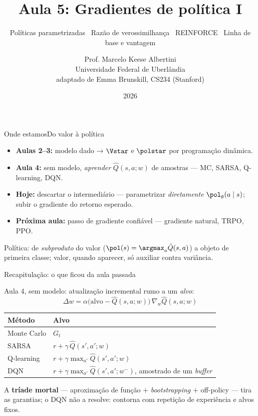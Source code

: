 \documentclass[aspectratio=169, 11pt]{beamer}
\title[Aula 5 — Gradientes de política I]{Aula 5: Gradientes de política I}
\subtitle[Aprendizagem por Reforço]{Políticas parametrizadas \textbullet\ Razão de verossimilhança \textbullet\ REINFORCE \textbullet\ Linha de base e vantagem}
\author[Prof. Marcelo K. Albertini]{Prof. Marcelo Keese Albertini \\
  \footnotesize Universidade Federal de Uberlândia \\
  \footnotesize adaptado de Emma Brunskill, CS234 (Stanford)}
\institute{Universidade Federal de Uberlândia}
\date{2026}
\newcommand{\thv}{\theta}                       %
\newcommand{\wv}{w}                             %
\newcommand{\polth}{\pol_{\thv}}                %
\newcommand{\Qhat}{\hat{Q}}
\begin{document}
\begin{frame}\titlepage\end{frame}

\begin{frame}{Onde estamos}{Do valor à política}

  \begin{itemize}\setlength{\itemsep}{0.5ex}
    \item \textbf{Aulas 2--3:} modelo dado → $\Vstar$ e $\polstar$ por
      programação dinâmica.
    \item \textbf{Aula 4:} sem modelo, \emph{aprender} $\Qhat(s,a;\wv)$ de
      amostras --- MC, SARSA, Q-learning, DQN.
    \item \textbf{Hoje:} descartar o intermediário --- parametrizar
      \emph{diretamente} $\polth(a\mid s)$; subir o gradiente do retorno
      esperado.
    \item \textbf{Próxima aula:} passo de gradiente confiável --- gradiente
      natural, TRPO, PPO.
  \end{itemize}

  \begin{ideiabox}
    Política: de \emph{subproduto} do valor ($\pol(s) = \argmax_a \Qhat(s,a)$)
    a objeto de primeira classe; valor, quando aparecer, só auxiliar contra
    variância.
  \end{ideiabox}
\end{frame}

\begin{frame}{Recapitulação: o que ficou da aula passada}

  Aula 4, sem modelo: atualização incremental rumo a um \emph{alvo}:
  \[
    \Delta \wv = \alpha\bigl(\text{alvo} - \Qhat(s,a;\wv)\bigr)\, \nabla_{\wv} \Qhat(s,a;\wv)
  \]

  \begin{center}\small
  \begin{tabular}{@{}ll@{}}
    \toprule
    \textbf{Método} & \textbf{Alvo} \\
    \midrule
    Monte Carlo   & $G_t$ \\
    SARSA         & $r + \gamma\,\Qhat(s',a';\wv)$ \\
    Q-learning    & $r + \gamma \max_{a'} \Qhat(s',a';\wv)$ \\
    DQN           & $r + \gamma \max_{a'} \Qhat(s',a';\wv^{-})$, amostrado de um \emph{buffer} \\
    \bottomrule
  \end{tabular}
  \end{center}

  \begin{alertabox}
    A \textbf{tríade mortal} --- aproximação de função $+$
    \emph{bootstrapping} $+$ off-policy --- tira as garantias; o DQN não a
    resolve: contorna com repetição de experiência e alvos fixos.
  \end{alertabox}
\end{frame}
\end{document}
